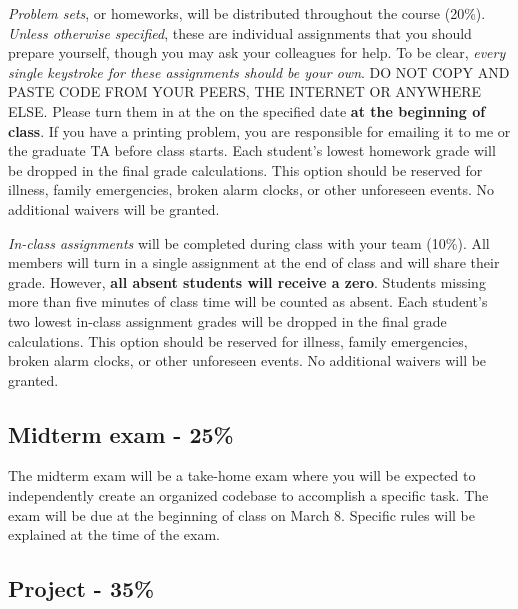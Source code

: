 \documentclass[11pt]{article}
\begin{document}
\noindent \textit{Problem sets}, or homeworks, will be distributed
throughout the course (20\%). \textit{Unless otherwise specified},
these are individual assignments that you should prepare yourself,
though you may ask your colleagues for help. To be clear,
\textit{every single keystroke for these assignments should be your
  own}.  DO NOT COPY AND PASTE CODE FROM YOUR PEERS, THE INTERNET OR
ANYWHERE ELSE.  Please turn them in at the on the specified date
\textbf{at the beginning of class}. If you have a printing problem,
you are responsible for emailing it to me or the graduate TA before
class starts.  Each student's lowest homework grade will be dropped in
the final grade calculations.  This option should be reserved for
illness, family emergencies, broken alarm clocks, or other unforeseen
events.  No additional waivers will be granted.

 \vspace{.4cm}
 \noindent \textit{In-class assignments} will be completed during class
 with your team (10\%).  All members will turn in a single assignment at
 the end of class and will share their grade. However, \textbf{all
   absent students will receive a zero}.  Students missing more than
 five minutes of class time will be counted as absent.  Each student's
 two lowest in-class assignment grades will be dropped in the final
 grade calculations.  This option should be reserved for illness,
 family emergencies, broken alarm clocks, or other unforeseen events.
 No additional waivers will be granted.

\subsection*{Midterm exam - 25\%}
The midterm exam will be a take-home exam where you will be expected
to independently create an organized codebase to accomplish a specific
task. The exam will be due at the beginning of class on March 8.  Specific rules will be
explained at the time of the exam.


\subsection*{Project - 35\%}
\end{document}
